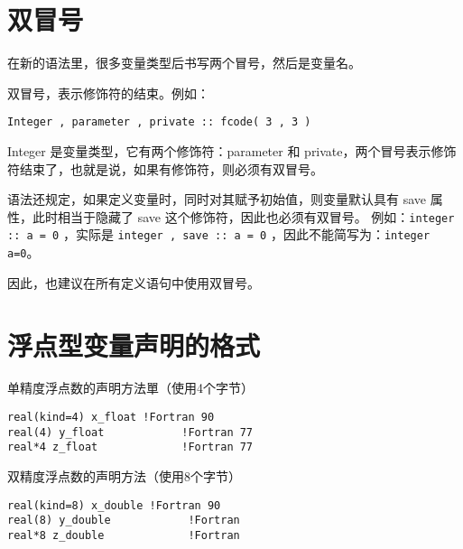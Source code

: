 \section{双冒号}
在新的语法里，很多变量类型后书写两个冒号，然后是变量名。

双冒号，表示修饰符的结束。例如：

\verb|Integer , parameter , private :: fcode( 3 , 3 )|

Integer 是变量类型，它有两个修饰符：parameter 和 private，两个冒号表示修饰符结束了，也就是说，如果有修饰符，则必须有双冒号。

语法还规定，如果定义变量时，同时对其赋予初始值，则变量默认具有 save 属性，此时相当于隐藏了 save 这个修饰符，因此也必须有双冒号。
例如：\verb|integer :: a = 0| ，实际是 \verb|integer , save :: a = 0| ，因此不能简写为：\verb|integer a=0|。

因此，也建议在所有定义语句中使用双冒号。


\section{浮点型变量声明的格式}
单精度浮点数的声明方法單（使用4个字节）
\begin{verbatim}
real(kind=4) x_float !Fortran 90
real(4) y_float            !Fortran 77
real*4 z_float             !Fortran 77
\end{verbatim}

双精度浮点数的声明方法（使用8个字节）
\begin{verbatim}
real(kind=8) x_double !Fortran 90
real(8) y_double            !Fortran
real*8 z_double             !Fortran
\end{verbatim}



